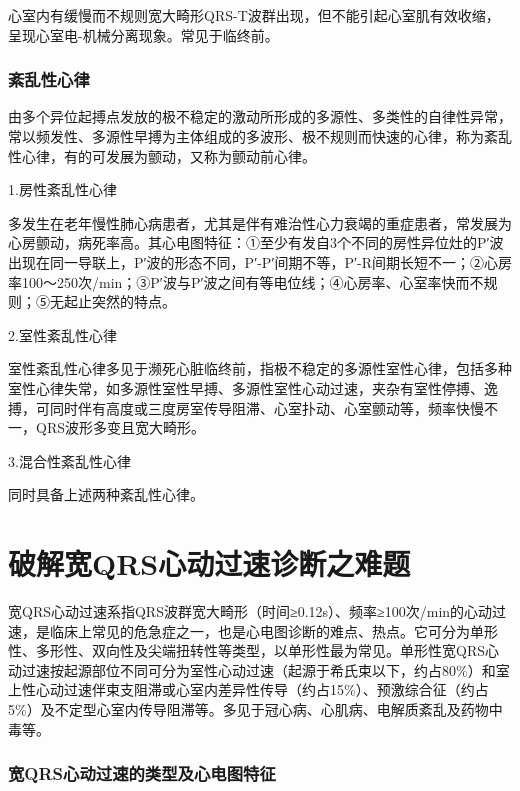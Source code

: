 心室内有缓慢而不规则宽大畸形QRS-T波群出现，但不能引起心室肌有效收缩，呈现心室电-机械分离现象。常见于临终前。

\protect\hypertarget{text00037.htmlux5cux23subid436}{}{}

\subsection{紊乱性心律}

由多个异位起搏点发放的极不稳定的激动所形成的多源性、多类性的自律性异常，常以频发性、多源性早搏为主体组成的多波形、极不规则而快速的心律，称为紊乱性心律，有的可发展为颤动，又称为颤动前心律。

1.房性紊乱性心律

多发生在老年慢性肺心病患者，尤其是伴有难治性心力衰竭的重症患者，常发展为心房颤动，病死率高。其心电图特征：①至少有发自3个不同的房性异位灶的P′波出现在同一导联上，P′波的形态不同，P′-P′间期不等，P′-R间期长短不一；②心房率100～250次/min；③P′波与P′波之间有等电位线；④心房率、心室率快而不规则；⑤无起止突然的特点。

2.室性紊乱性心律

室性紊乱性心律多见于濒死心脏临终前，指极不稳定的多源性室性心律，包括多种室性心律失常，如多源性室性早搏、多源性室性心动过速，夹杂有室性停搏、逸搏，可同时伴有高度或三度房室传导阻滞、心室扑动、心室颤动等，频率快慢不一，QRS波形多变且宽大畸形。

3.混合性紊乱性心律

同时具备上述两种紊乱性心律。

\protect\hypertarget{text00038.html}{}{}

\protect\hypertarget{text00038.htmlux5cux23chapter38}{}{}

\chapter{破解宽QRS心动过速诊断之难题}

宽QRS心动过速系指QRS波群宽大畸形（时间≥0.12s）、频率≥100次/min的心动过速，是临床上常见的危急症之一，也是心电图诊断的难点、热点。它可分为单形性、多形性、双向性及尖端扭转性等类型，以单形性最为常见。单形性宽QRS心动过速按起源部位不同可分为室性心动过速（起源于希氏束以下，约占80\%）和室上性心动过速伴束支阻滞或心室内差异性传导（约占15\%）、预激综合征（约占5\%）及不定型心室内传导阻滞等。多见于冠心病、心肌病、电解质紊乱及药物中毒等。

\protect\hypertarget{text00038.htmlux5cux23subid437}{}{}

\subsection{宽QRS心动过速的类型及心电图特征}

